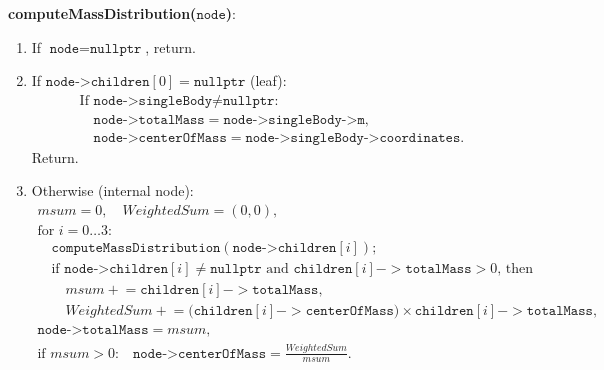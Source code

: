\documentclass{article}
\begin{document}
\vspace{1ex}
\noindent\textbf{computeMassDistribution(\(\texttt{node}\))}: 
\begin{enumerate}
  \item If \(\texttt{node} = \texttt{nullptr}\), return.
  \item If \(\texttt{node->children}[0] = \texttt{nullptr}\) (leaf):
    \[
    \begin{array}{l}
      \text{If }\texttt{node->singleBody} \neq \texttt{nullptr}\text{:}\\
      \quad \texttt{node->totalMass}       = \texttt{node->singleBody->m},\\
      \quad \texttt{node->centerOfMass}    = \texttt{node->singleBody->coordinates}.
    \end{array}
    \]
    Return.
  \item Otherwise (internal node):
    \[
    \begin{array}{l}
      msum = 0,\quad WeightedSum = (0,0),\\
      \text{for }i = 0\ldots3\text{:}\\
      \quad \texttt{computeMassDistribution}(\texttt{node->children}[i]);\\
      \quad \text{if }\texttt{node->children}[i]\neq\texttt{nullptr}\text{ and } 
             \texttt{children}[i]->\texttt{totalMass} > 0\text{, then}\\
      \quad\quad msum \mathrel{+}= \texttt{children}[i]->\texttt{totalMass},\\
      \quad\quad WeightedSum \mathrel{+}= 
                \bigl(\texttt{children}[i]->\texttt{centerOfMass}\bigr)\times 
                \texttt{children}[i]->\texttt{totalMass},\\
      \texttt{node->totalMass} = msum,\\
      \text{if }msum > 0\text{:}
      \quad \texttt{node->centerOfMass} = \frac{WeightedSum}{msum}.
    \end{array}
    \]
\end{enumerate}
\end{document}

